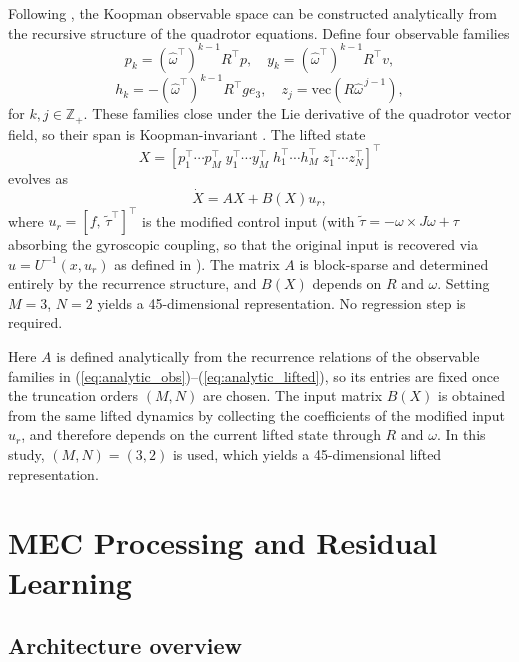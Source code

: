 \documentclass{article}
\begin{document}
Following \cite{rajkumar2025}, the Koopman observable space can be constructed analytically from the recursive structure of the quadrotor equations. Define four observable families
\begin{equation}
p_k = (\hat{\omega}^\top)^{k-1} R^\top p, \quad
y_k = (\hat{\omega}^\top)^{k-1} R^\top v,
\end{equation}
\begin{equation}
h_k = -(\hat{\omega}^\top)^{k-1} R^\top g e_3, \quad
z_j = \mathrm{vec}(R \hat{\omega}^{\,j-1}),
\label{eq:analytic_obs}
\end{equation}
for $k,j\in\mathbb{Z}_{+}$. These families close under the Lie derivative of the quadrotor vector field, so their span is Koopman-invariant \cite{rajkumar2025}. The lifted state
\begin{equation}
X = [p_1^\top \cdots p_M^\top \; y_1^\top \cdots y_M^\top \; h_1^\top \cdots h_M^\top \; z_1^\top \cdots z_N^\top]^\top
\label{eq:analytic_lifted}
\end{equation}
evolves as
\begin{equation}
\dot{X} = A X + B(X) u_r,
\label{eq:analytic_ql}
\end{equation}
where $u_r = [f,\,\tilde{\tau}^{\top}]^{\top}$ is the modified control input (with $\tilde{\tau}=-\omega\times J\omega+\tau$ absorbing the gyroscopic coupling, so that the original input is recovered via $u=U^{-1}(x,u_r)$ as defined in \cite{rajkumar2025}). The matrix $A$ is block-sparse and determined entirely by the recurrence structure, and $B(X)$ depends on $R$ and $\omega$. Setting $M=3$, $N=2$ yields a 45-dimensional representation. No regression step is required.

Here $A$ is defined analytically from the recurrence relations of the observable families in (\ref{eq:analytic_obs})--(\ref{eq:analytic_lifted}), so its entries are fixed once the truncation orders $(M,N)$ are chosen. The input matrix $B(X)$ is obtained from the same lifted dynamics by collecting the coefficients of the modified input $u_r$, and therefore depends on the current lifted state through $R$ and $\omega$. In this study, $(M,N)=(3,2)$ is used, which yields a 45-dimensional lifted representation.



\section{MEC Processing and Residual Learning}

\subsection{Architecture overview}
\end{document}
